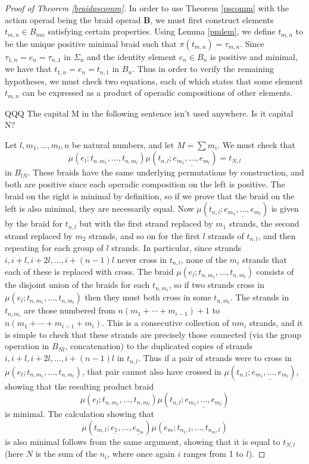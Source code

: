 \documentclass{amsbook} %
\newcommand{\mb}{\mathbf}
\numberwithin{section}{chapter}
\begin{document}
\begin{proof}[Proof of Theorem \ref{braidpscomm}]
In order to use Theorem \ref{pscomm} with the action operad being the braid operad $\mb{B}$, we must first construct elements $t_{m,n} \in B_{mn}$ satisfying certain properties.  Using Lemma \ref{pmlem}, we define $t_{m,n}$ to be the unique positive minimal braid such that $\pi(t_{m,n}) = \tau_{m,n}$.  Since $\tau_{1,n} = e_{n} = \tau_{n,1}$ in $\Sigma_{n}$ and the identity element $e_{n} \in B_{n}$ is positive and minimal, we have that $t_{1,n} = e_{n} = t_{n,1}$ in $B_{n}$.  Thus in order to verify the remaining hypotheses, we must check two equations, each of which states that some element $t_{m,n}$ can be expressed as a product of operadic compositions of other elements.

QQQ The capital M in the following sentence isn't used anywhere. Is it capital N?

Let $l, m_{1}, \ldots, m_{l}, n$ be natural numbers, and let $M = \sum m_{i}$.  We must check that
\[
\mu(e_{l}; t_{n, m_{1}}, \ldots, t_{n, m_{l}}) \mu(t_{n,l}; \underline{e_{m_{1}}, \ldots, e_{m_{l}}}) = t_{N, l}
\]
in $B_{lN}$.  These braids have the same underlying permutations by construction, and both are positive since each operadic composition on the left is positive.  The braid on the right is minimal by definition, so if we prove that the braid on the left is also minimal, they are necessarily equal.  Now $\mu(t_{n,l}; \underline{e_{m_{1}}, \ldots, e_{m_{l}}})$ is given by the braid for $t_{n,l}$ but with the first strand replaced by $m_{1}$ strands, the second strand replaced by $m_{2}$ strands, and so on for the first $l$ strands of $t_{n,l}$, and then repeating for each group of $l$ strands.  In particular, since strands $i, i+l, i+2l, \ldots, i + (n-1)l$ never cross in $t_{n,l}$, none of the $m_{i}$ strands that each of these is replaced with cross.  The braid $\mu(e_{l}; t_{n, m_{1}}, \ldots, t_{n, m_{l}})$ consists of the disjoint union of the braids for each $t_{n,m_{i}}$, so if two strands cross in $\mu(e_{l}; t_{n, m_{1}}, \ldots, t_{n, m_{l}})$ then they must both cross in some $t_{n,m_{i}}$.  The strands in $t_{n,m_{i}}$ are those numbered from $n(m_{1} + \cdots + m_{i-1}) + 1$ to $n(m_{1} + \cdots + m_{i-1} + m_{i})$.  This is a consecutive collection of $nm_{i}$ strands, and it is simple to check that these strands are precisely those connected (via the group operation in $B_{Nl}$, concatenation) to the duplicated copies of strands $i, i+l, i+2l, \ldots, i + (n-1)l$ in $t_{n,l}$.  Thus if a pair of strands were to cross in $\mu(e_{l}; t_{n, m_{1}}, \ldots, t_{n, m_{l}})$, that pair cannot also have crossed in $\mu(t_{n,l}; \underline{e_{m_{1}}, \ldots, e_{m_{l}}})$, showing that the resulting product braid
\[
\mu(e_{l}; t_{n, m_{1}}, \ldots, t_{n, m_{l}}) \mu(t_{n,l}; \underline{e_{m_{1}}, \ldots, e_{m_{l}}})
\]
is minimal.  The calculation showing that
\[
\mu(t_{m,l}; \underline{e_{1}}, \ldots, \underline{e_{n_{m}}}) \mu(e_{m}; t_{n_{1}, l}, \ldots, t_{n_{m}, l})
\]
is also minimal follows from the same argument, showing that it is equal to $t_{N, l}$ (here $N$ is the sum of the $n_{i}$, where once again $i$ ranges from 1 to $l$).


\end{proof}
\end{document}
